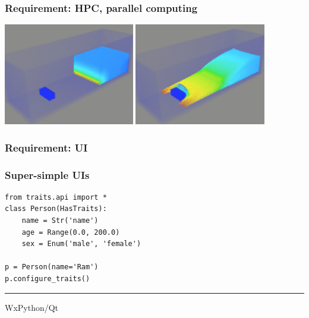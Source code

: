 \documentclass[14pt,compress]{beamer}
\begin{document}
\begin{frame}[plain]
    \frametitle{Requirement: HPC, parallel computing}
    \begin{center}
    \includegraphics[height=1.75in]{data/intro/dam_break_poster_0}
    \includegraphics[height=1.75in]{data/intro/dam_break_poster}
  \end{center}
\end{frame}

\begin{frame}[plain]
  \frametitle{Requirement: UI}

  \begin{center}

  \end{center}

\end{frame}

\begin{frame}
    \frametitle{Super-simple UIs}
\begin{lstlisting}
from traits.api import *
class Person(HasTraits):
    name = Str('name')
    age = Range(0.0, 200.0)
    sex = Enum('male', 'female')

p = Person(name='Ram')
p.configure_traits()
\end{lstlisting}
\hrule
{}
\begin{center}WxPython/Qt
\end{center}
\end{frame}
\end{document}

